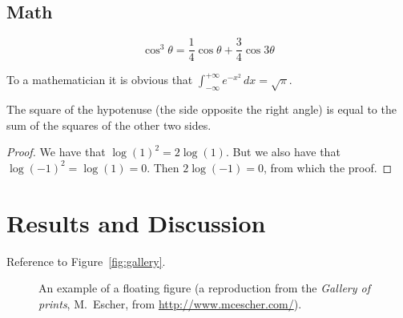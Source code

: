 \documentclass[
12pt, %
a4paper, %
oneside, %
headinclude,footinclude, %
BCOR5mm, %
german]{scrartcl}
\begin{document}

\subsection{Math}

\lipsum[4] %

\begin{equation}
\cos^3 \theta =\frac{1}{4}\cos\theta+\frac{3}{4}\cos 3\theta
\label{eq:refname2}
\end{equation}

\lipsum[5] %

\begin{definition}[Gauss]
To a mathematician it is obvious that
$\int_{-\infty}^{+\infty}
e^{-x^2}\,dx=\sqrt{\pi}$.
\end{definition}

\begin{theorem}[Pythagoras]
The square of the hypotenuse (the side opposite the right angle) is equal to the sum of the squares of the other two sides.
\end{theorem}

\begin{proof}
We have that $\log(1)^2 = 2\log(1)$.
But we also have that $\log(-1)^2=\log(1)=0$.
Then $2\log(-1)=0$, from which the proof.
\end{proof}


\section{Results and Discussion}

Reference to Figure~\vref{fig:gallery}. %

\begin{figure}[tb]
\centering
\caption[An example of a floating figure]{An example of a floating figure (a reproduction from the \emph{Gallery of prints}, M.~Escher, from \url{http://www.mcescher.com/}).} %
\label{fig:gallery}
\end{figure}
\end{document}
